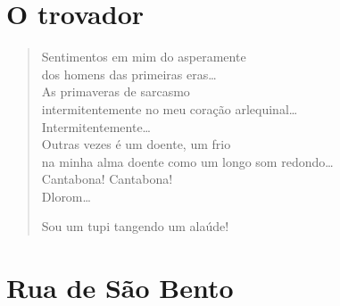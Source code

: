 \chapter{O trovador}

\begin{verse}
Sentimentos em mim do asperamente\\
dos homens das primeiras eras\ldots{}\\
As primaveras de sarcasmo\\
intermitentemente no meu coração arlequinal\ldots{}\\
Intermitentemente\ldots{}\\
Outras vezes é um doente, um frio\\
na minha alma doente como um longo som redondo\ldots{}\\
Cantabona! Cantabona!\\
Dlorom\ldots{}

Sou um tupi tangendo um alaúde!
\end{verse}

\chapter{Rua de São Bento}

